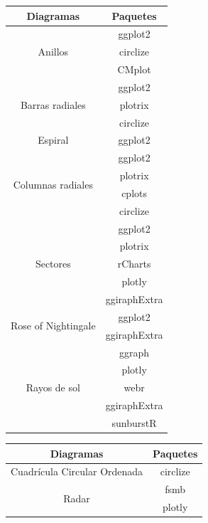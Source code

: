 \documentclass{article}\usepackage[]{graphicx}\usepackage[]{color}
\begin{document}
\begin{table}[h!]
\begin{tabular}{|c|c|} 
\hline
Diagramas & Paquetes \\
\hline
\multirow{3}{14em}{Anillos} & ggplot2 \\ 
                            & circlize \\ 
                            & CMplot \\ 
\hline
\multirow{3}{14em}{Barras radiales} & ggplot2 \\ 
                            & plotrix \\ 
                            & circlize \\ 
\hline
\multirow{1}{14em}{Espiral} & ggplot2 \\ 
\hline
\multirow{4}{14em}{Columnas radiales} & ggplot2 \\ 
                            & plotrix \\
                            & cplots \\ 
                            & circlize \\ 
\hline
\multirow{5}{14em}{Sectores} & ggplot2 \\ 
                            & plotrix \\ 
                            & rCharts \\ 
                            & plotly \\ 
                            & ggiraphExtra \\  
\hline
\multirow{2}{14em}{Rose of Nightingale} & ggplot2 \\ 
                            & ggiraphExtra \\ 
\hline
\multirow{5}{14em}{Rayos de sol} & ggraph \\ 
                            & plotly \\
                            & webr \\
                            & ggiraphExtra \\ 
                            & sunburstR \\
\hline
\end{tabular}
\begin{tabular}{|c|c|}
\hline
Diagramas & Paquetes \\
\hline
\multirow{1}{14em}{Cuadr\'icula Circular Ordenada} & circlize \\ 
\hline
\multirow{4}{14em}{Radar} & fsmb \\ 
                            & plotly \\ 

\end{tabular}
\end{table}
\end{document}
